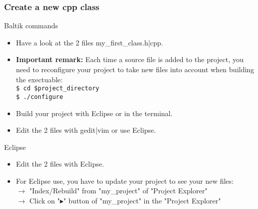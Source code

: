 \documentclass[10pt, hyperref={unicode=true,pdfusetitle, bookmarks=true,bookmarksnumbered=false,bookmarksopen=false, breaklinks=false,pdfborder={0 0 1},backref=true,colorlinks=true,linkcolor=darkblue,pageanchor, urlcolor=darkblue}]{beamer}
\begin{document}
\begin{frame}
\frametitle{Create a new cpp class}

\begin{block}{Baltik commands}
\begin{itemize}
\item Have a look at the 2 files my\_first\_class.h|cpp.\\

\item \textbf{Important remark:} Each time a source file is added to the project, you need to reconfigure your project to take new files into account when building the exectuable:\\
\texttt{\$ cd \$project\_directory}\\
\texttt{\$ ./configure}

\item Build your project with Eclipse or in the terminal.

\item Edit the 2 files with gedit|vim or use Eclipse.
\end{itemize}
\end{block}

\begin{exampleblock}{Eclipse}
\begin{itemize}
\item Edit the 2 files with Eclipse.

\item For Eclipse use, you have to update your project to see your new files:\\
$\rightarrow$ "Index/Rebuild" from "my\_project" of "Project Explorer"\\
$\rightarrow$ Click on "$\blacktriangleright$" button of "my\_project" in the "Project Explorer"

\end{itemize}
\end{exampleblock}
\end{frame}
\end{document}
